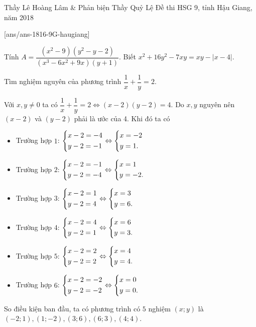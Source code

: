 \begin{name}
{Thầy  Lê Hoàng Lâm \& Phản biện Thầy Quỷ Lệ}
{Đề thi HSG 9, tỉnh Hậu Giang, năm 2018}
\end{name}
\setcounter{ex}{0}
[ans/ans-1816-9G-haugiang]
\begin{ex}%
	Tính $A=\dfrac{(x^2-9)(y^2-y-2)}{(x^3-6x^2+9x)(y+1)}$. Biết $x^2+16y^2-7xy=xy-|x-4|$.
\end{ex}
\begin{ex}%
    Tìm nghiệm nguyên của phương trình $\dfrac{1}{x}+\dfrac{1}{y}=2$.
\loigiai
    {
    Với $x,y\ne 0$ ta có $\dfrac{1}{x}+\dfrac{1}{y}=2\Leftrightarrow(x-2)(y-2)=4$. Do $x,y$ nguyên nên $(x-2)$ và $(y-2)$ phải là ước của 4. Khi đó ta có
    \begin{itemize}
    	\item Trường hợp $1$: $\left\{\begin{aligned}&x-2=-4\\&y-2=-1\end{aligned}\right.\Leftrightarrow\left\{\begin{aligned}&x=-2\\&y=1.\end{aligned}\right.$
    	\item Trường hợp $2$:  $\left\{\begin{aligned}&x-2=-1\\&y-2=-4\end{aligned}\right.\Leftrightarrow\left\{\begin{aligned}&x=1\\&y=-2.\end{aligned}\right.$
    	\item Trường hợp $3$:  $\left\{\begin{aligned}&x-2=1\\&y-2=4\end{aligned}\right.\Leftrightarrow\left\{\begin{aligned}&x=3\\&y=6.\end{aligned}\right.$
    	\item Trường hợp $4$:  $\left\{\begin{aligned}&x-2=4\\&y-2=1\end{aligned}\right.\Leftrightarrow\left\{\begin{aligned}&x=6\\&y=3.\end{aligned}\right.$
    	\item Trường hợp $5$: $\left\{\begin{aligned}&x-2=2\\&y-2=2\end{aligned}\right.\Leftrightarrow\left\{\begin{aligned}&x=4\\&y=4.\end{aligned}\right.$
    	\item Trường hợp $6$: $\left\{\begin{aligned}&x-2=-2\\&y-2=-2\end{aligned}\right.\Leftrightarrow\left\{\begin{aligned}&x=0\\&y=0.\end{aligned}\right.$
    \end{itemize}
     So điều kiện ban đầu, ta có phương trình có $5$ nghiệm $(x;y)$ là $(-2;1),(1;-2),(3;6),(6;3),(4;4)$.
    }
\end{ex}

